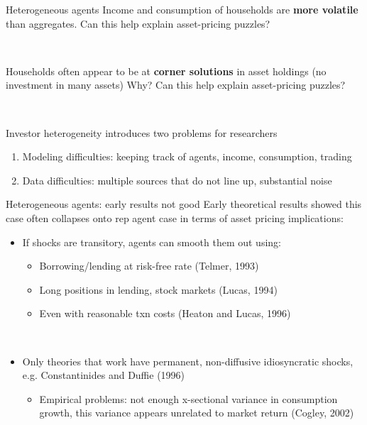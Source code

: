 \documentclass[xcolor=table, aspectratio=169]{beamer}
\newcommand{\alertbf}[1]{\alert{\textbf{#1}}}
\begin{document}
\begin{frame}{Heterogeneous agents}
Income and consumption of households are \alertbf{more volatile} than aggregates. Can this help explain asset-pricing puzzles?

~

Households often appear to be at \alertbf{corner solutions} in asset holdings (no investment in many assets) Why?
Can this help explain asset-pricing puzzles?

~

Investor heterogeneity introduces two problems for researchers
\begin{enumerate}
\item Modeling difficulties: keeping track of agents, income, consumption, trading
\item Data difficulties: multiple sources that do not line up, substantial noise
\end{enumerate}
\end{frame}

\begin{frame}{Heterogeneous agents: early results not good}
Early theoretical results showed this case often collapses onto rep agent case in terms of asset pricing implications:

\begin{itemize}
\item If shocks are transitory, agents can smooth them out using:
\begin{itemize}
\item Borrowing/lending at risk-free rate (Telmer, 1993)
\item Long positions in lending, stock markets (Lucas, 1994)
\item Even with reasonable txn costs (Heaton and Lucas, 1996)
\end{itemize}

~

\item Only theories that work have permanent, non-diffusive idiosyncratic shocks, e.g. Constantinides and Duffie (1996) 

\begin{itemize}
\item Empirical problems: not enough x-sectional variance in consumption growth, this variance appears unrelated to market return (Cogley, 2002)
\end{itemize}
\end{itemize}
\end{frame}
\end{document}

